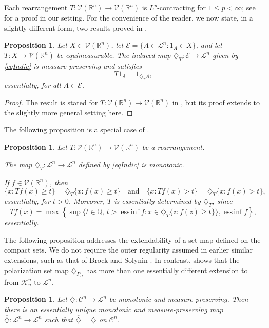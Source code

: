 \documentclass[12pt,reqno]{amsart}
\DeclareMathOperator*{\essinf}{ess\,inf}
\newcommand{\Q}{{\mathbb Q}}
\newcommand{\R}{{\mathbb R}}
\newcommand{\cK}{\mathcal K}
\newcommand{\cL}{\mathcal L}
\newcommand{\cE}{{\mathcal E}}
\newcommand{\cV}{{\mathcal V}}
\newtheorem{prop}[thm]{Proposition}
\newcommand{\di}{\diamondsuit}
\numberwithin{equation}{section}
\begin{document}
Each rearrangement $T:\cV(\R^n)\to\cV(\R^n)$ is $L^p$-contracting for  $1\le p<\infty$; see \cite[Proposition~3.7 and Appendix~A]{BGGK2} for a proof in our setting. For the convenience of the reader, we now state, in a slightly different form, two results proved in \cite{BGGK1}.

\begin{prop}\label{fromSetToFct}
Let $X\subset {\cV}(\R^n)$, let $\cE=\{A\in {\cL}^n: 1_A\in X\}$, and let $T:X\to  {\cV}(\R^n)$ be equimeasurable. The induced map $\di_T:\cE\to \cL^n$ given by \eqref{eqIndic} is measure preserving and satisfies
\begin{equation}\label{eqoct72}
T1_A=1_{\di_TA},
\end{equation}
essentially, for all $A\in \cE$.
\end{prop}

\begin{proof}
The result is stated for $T:\cV(\R^n)\to \cV(\R^n)$ in \cite[Lemma~4.5]{BGGK1}, but its proof extends to the slightly more general setting here.
\end{proof}

The following proposition is a special case of \cite[Lemma~4.8]{BGGK1}.

\begin{prop}\label{lemapril30}
Let $T:{\cV}(\R^n)\to{\cV}(\R^n)$ be a rearrangement.

  The map  $\di_T:\cL^n\to \cL^n$ defined by \eqref{eqIndic} is monotonic.

 If $f\in {\cV}(\R^n)$, then
$$
\{x: Tf(x)\ge t\}=\di_T\{x: f(x)\ge t\}\quad{\text{and}}\quad\{x: Tf(x)> t\}=\di_T\{x: f(x)> t\},
$$
essentially, for $t>0$.  Moreover, $T$ is essentially determined by $\di_T$, since
\begin{equation}\label{eqoct62}
Tf(x)=\max\left\{\sup\{t\in \Q,\, t>\essinf f: x\in \di_T \{z: f(z)\ge t\}\},\essinf f\right\},
\end{equation}
essentially.
\end{prop}

The following proposition addresses the extendability of a set map defined on the compact sets.  We do not require the outer regularity assumed in earlier similar extensions, such as that of Brock and Solynin \cite[Section~3]{BS}.  In contrast, \cite[Example~6.8]{BGGK1} shows that the polarization set map $\di_{P_H}$ has more than one essentially different extension to from ${\cK}^n_n$ to ${\cL}^n$.

\begin{prop}
Let $\di:{\mathcal{C}}^n \to \cL^n$ be monotonic and measure preserving. Then there is an essentially unique monotonic and measure-preserving map $\overline{\di}: \cL^n\to\cL^n$ such that $\overline{\di}=\di$ on ${\mathcal{C}}^n $.
\end{prop}
\end{document}
